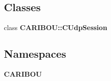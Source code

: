 \subsection*{Classes}
\begin{DoxyCompactItemize}
\item 
class {\bf C\+A\+R\+I\+B\+O\+U\+::\+C\+Udp\+Session}
\end{DoxyCompactItemize}
\subsection*{Namespaces}
\begin{DoxyCompactItemize}
\item 
 {\bf C\+A\+R\+I\+B\+OU}
\end{DoxyCompactItemize}
